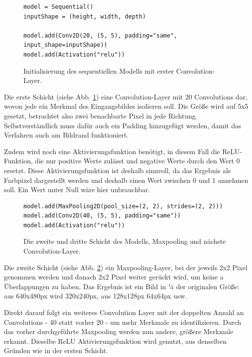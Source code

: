 \documentclass[conference]{IEEEtran}
\begin{document}
	\begin{figure}[!h]
		\centering
		\begin{verbatim}
model = Sequential()
inputShape = (height, width, depth)

model.add(Conv2D(20, (5, 5), padding="same", input_shape=inputShape))
model.add(Activation("relu"))
		\end{verbatim}
		\caption{Initialisierung des sequentiellen Modells mit erster Convolution-Layer.}
		\label{erstes Modell: Schicht eins}
	\end{figure}


	Die erste Schicht (siehe Abb. \ref{erstes Modell: Schicht eins}) eine Convolution-Layer mit 20 Convolutions dar, 
	wovon jede ein Merkmal des Eingangsbildes isolieren soll.
	Die Größe wird auf 5x5 gesetzt, betrachtet also zwei benachbarte Pixel in 
	jede Richtung.
	Selbstverständlich muss dafür auch ein Padding hinzugefügt werden, damit das Verfahren auch am Bildrand funktioniert. 
	
	Zudem wird noch eine Aktivierungsfunktion benötigt, in diesem Fall  die 
	ReLU-Funktion, die nur positive Werte zulässt und negative Werte durch 
	den Wert 0 ersetzt.
	Diese Aktivierungsfunktion ist deshalb sinnvoll, da das Ergebnis als 
	Farbpixel dargestellt werden und deshalb einen Wert zwischen 0 und 1 
	annehmen soll.
	Ein Wert unter Null wäre hier unbrauchbar.

	\begin{figure}[!h]
		\centering
		\begin{verbatim}
model.add(MaxPooling2D(pool_size=(2, 2), strides=(2, 2)))
model.add(Conv2D(40, (5, 5), padding="same"))
model.add(Activation("relu"))
		\end{verbatim}
		\caption{Die zweite und dritte Schicht des Modells, Maxpooling und nächste Convolution-Layer.}
		\label{erstes Modell: Schicht zwei und drei}
	\end{figure}

	
	Die zweite Schicht (siehe Abb. \ref{erstes Modell: Schicht zwei und drei}) ein Maxpooling-Layer, bei der jeweils 2x2 Pixel 
	genommen werden und danach 2x2 Pixel weiter gerückt wird, um keine a
	Überlappungen zu haben.
	Das Ergebnis ist ein Bild in ¼ der originalen Größe: aus 640x480px wird 320x240px, aus 128x128px 64x64px usw.
	
	Direkt darauf folgt ein weiteres Convolution Layer mit der doppelten 
	Anzahl an Convolutions - 40 statt vorher 20 - um mehr Merkmale zu 
	identifizieren.
	Durch das vorher durchgeführte Maxpooling werden nun andere, größere Merkmale erkannt.
	 Dieselbe ReLU Aktivierungsfunktion wird genutzt, aus denselben 
	 Gründen wie in der ersten Schicht.
\end{document}
